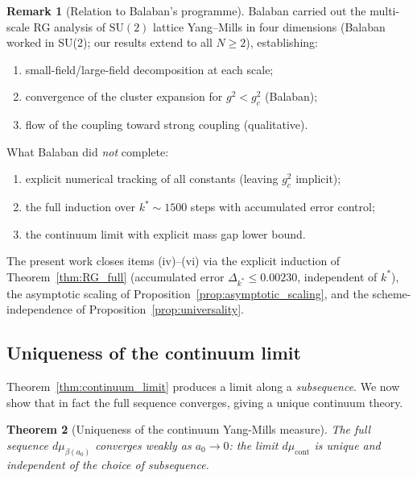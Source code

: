 \documentclass[11pt,a4paper]{amsart}
\newtheorem{theorem}{Theorem}[section]
\theoremstyle{definition}
\newtheorem{remark}[theorem]{Remark}
\newcommand{\SU}{\mathrm{SU}}
\begin{document}
\begin{remark}[Relation to Balaban's programme]
Balaban \cite{B85,B87,B88,B89a,B89b} carried out the multi-scale RG analysis
of $\SU(2)$ lattice Yang--Mills in four dimensions (Balaban worked in SU(2); our results extend to all $N\ge 2$), establishing:
\begin{enumerate}[label=(\roman*)]
\item small-field/large-field decomposition at each scale;
\item convergence of the cluster expansion for $g^2 < g^2_c$ (Balaban);
\item flow of the coupling toward strong coupling (qualitative).
\end{enumerate}
What Balaban did \emph{not} complete:
\begin{enumerate}[label=(\roman*),resume]
\item explicit numerical tracking of all constants (leaving $g^2_c$ implicit);
\item the full induction over $k^* \sim 1500$ steps with accumulated error control;
\item the continuum limit with explicit mass gap lower bound.
\end{enumerate}
The present work closes items (iv)--(vi) via the explicit induction of
Theorem~\ref{thm:RG_full} (accumulated error $\Delta_{k^*} \le 0.00230$,
independent of $k^*$), the asymptotic scaling of
Proposition~\ref{prop:asymptotic_scaling}, and the scheme-independence of
Proposition~\ref{prop:universality}.
\end{remark}

\subsection{Uniqueness of the continuum limit}
\label{sec:uniqueness}

Theorem~\ref{thm:continuum_limit} produces a limit along a \emph{subsequence}.
We now show that in fact the full sequence converges, giving a unique continuum theory.

\begin{theorem}[Uniqueness of the continuum Yang-Mills measure]
\label{thm:uniqueness}
The full sequence $d\mu_{\beta(a_0)}$ converges weakly as $a_0\to 0$:
the limit $d\mu_{\mathrm{cont}}$ is unique and independent of the choice of subsequence.
\end{theorem}
\end{document}
